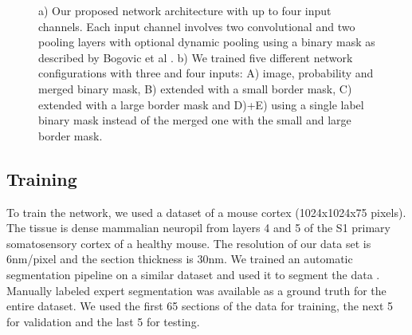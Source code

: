 \begin{figure}[t]
 \centering
    \hfill
	\caption{a) Our proposed network architecture with up to four input channels. Each input channel involves two convolutional and two pooling layers with optional dynamic pooling using a binary mask as described by Bogovic et al \cite{viren}. b) We trained five different network configurations with three and four inputs: A) image, probability and merged binary mask, B) extended with a small border mask, C) extended with a large border mask and D)+E) using a single label binary mask instead of the merged one with the small and large border mask.}
\end{figure}
%  



\subsection{Training}

To train the network, we used a dataset of a mouse cortex (1024x1024x75 pixels). The tissue is dense mammalian neuropil from layers 4 and 5 of the S1 primary somatosensory cortex of a healthy mouse. The resolution of our data set is 6nm/pixel and the section thickness is 30nm. We trained an automatic segmentation pipeline on a similar dataset and used it to segment the data \cite{rhoana}. Manually labeled expert segmentation was available as a ground truth for the entire dataset. We used the first 65 sections of the data for training, the next 5 for validation and the last 5 for testing.

